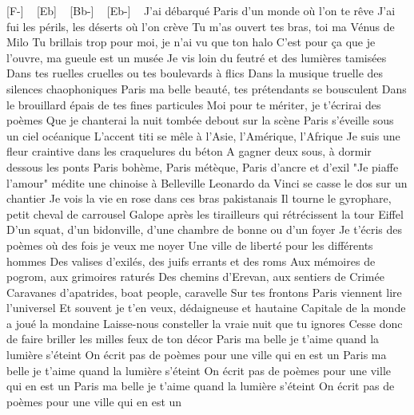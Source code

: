 
[F-] ~ [Eb] ~ [Bb-] ~ [Eb-] ~
J'ai débarqué Paris d'un monde où l'on te rêve
J'ai fui les périls, les déserts où l'on crève
Tu m'as ouvert tes bras, toi ma Vénus de Milo
Tu brillais trop pour moi, je n'ai vu que ton halo
C'est pour ça que je l'ouvre, ma gueule est un musée
Je vis loin du feutré et des lumières tamisées
Dans tes ruelles cruelles ou tes boulevards à flics
Dans la musique truelle des silences chaophoniques
Paris ma belle beauté, tes prétendants se bousculent
Dans le brouillard épais de tes fines particules
Moi pour te mériter, je t'écrirai des poèmes
Que je chanterai la nuit tombée debout sur la scène
Paris s'éveille sous un ciel océanique
L'accent titi se mêle à l'Asie, l'Amérique, l'Afrique
Je suis une fleur craintive dans les craquelures du béton
A gagner deux sous, à dormir dessous les ponts
Paris bohème, Paris métèque, Paris d'ancre et d'exil
"Je piaffe l'amour" médite une chinoise à Belleville
Leonardo da Vinci se casse le dos sur un chantier
Je vois la vie en rose dans ces bras pakistanais
Il tourne le gyrophare, petit cheval de carrousel
Galope après les tirailleurs qui rétrécissent la tour Eiffel
D'un squat, d'un bidonville, d'une chambre de bonne ou d'un foyer
Je t'écris des poèmes où des fois je veux me noyer
Une ville de liberté pour les différents hommes
Des valises d'exilés, des juifs errants et des roms
Aux mémoires de pogrom, aux grimoires raturés
Des chemins d'Erevan, aux sentiers de Crimée
Caravanes d'apatrides, boat people, caravelle
Sur tes frontons Paris viennent lire l'universel
Et souvent je t'en veux, dédaigneuse et hautaine
Capitale de la monde a joué la mondaine
Laisse-nous consteller la vraie nuit que tu ignores
Cesse donc de faire briller les milles feux de ton décor
Paris ma belle je t'aime quand la lumière s'éteint
On écrit pas de poèmes pour une ville qui en est un
Paris ma belle je t'aime quand la lumière s'éteint
On écrit pas de poèmes pour une ville qui en est un
Paris ma belle je t'aime quand la lumière s'éteint
On écrit pas de poèmes pour une ville qui en est un